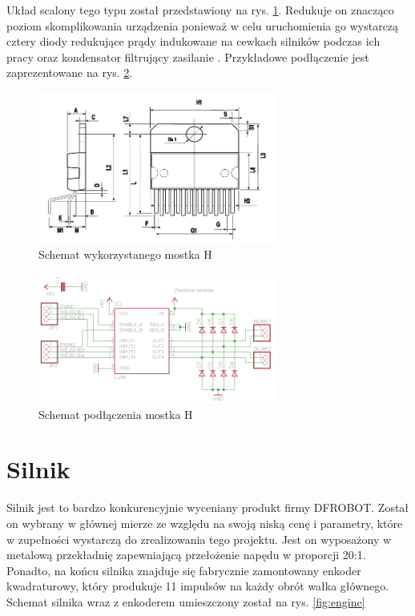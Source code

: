             Układ scalony tego typu został przedstawiony na rys. \ref{fig:h_bridge}. Redukuje on znacząco poziom skomplikowania urządzenia ponieważ w celu uruchomienia go wystarczą cztery diody redukujące prądy indukowane na cewkach silników podczas ich pracy oraz kondensator filtrujący zasilanie \cite{mostek}. Przykładowe podłączenie jest zaprezentowane na rys. \ref{fig:h_bridge_connection}.
            
            \begin{figure}[ht]
                \centering
                \includegraphics[width=0.7\textwidth]{img/h_bridge.png}
                \caption{Schemat wykorzystanego mostka H}
                \label{fig:h_bridge}
            \end{figure}
            
            \begin{figure}[ht]
                \centering
                \includegraphics[width=0.7\textwidth]{img/h_bridge_connection.png}
                \caption{Schemat podłączenia mostka H}
                \label{fig:h_bridge_connection}
            \end{figure}
            
        \section{Silnik}
            Silnik jest to bardzo konkurencyjnie wyceniany produkt firmy DFROBOT. Został on wybrany w głównej mierze ze względu na swoją niską cenę i parametry, które w zupełności wystarczą do zrealizowania tego projektu. Jest on wyposażony w metalową przekładnię zapewniającą przełożenie napędu w proporcji 20:1. Ponadto, na końcu silnika znajduje się fabrycznie zamontowany enkoder kwadraturowy, który produkuje 11 impulsów na każdy obrót wałka głównego. Schemat silnika wraz z enkoderem umieszczony został na rys. \ref{fig:engine}
            
